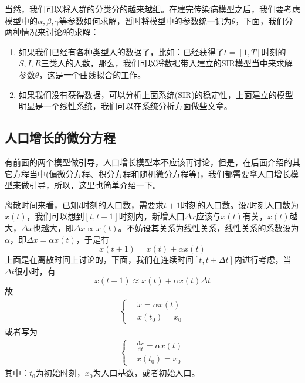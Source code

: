 		\par
		当然，我们可以将人群的分类分的越来越细。在建完传染病模型之后，我们要考虑模型中的$\alpha ,\beta, \gamma$等参数如何求解，暂时将模型中的参数统一记为$\theta $，下面，我们分两种情况来讨论$\theta $的求解：
		\begin{enumerate}
		\item 如果我们已经有各种类型人的数据了，比如：已经获得了$t = [1,T]$时刻的$S,I,R$三类人的人数，那么，我们可以将数据带入建立的SIR模型当中来求解参数$\theta $，这是一个曲线拟合的工作。
		\item 如果我们没有获得数据，可以分析上面系统(SIR)的稳定性，上面建立的模型明显是一个线性系统，我们可以在系统分析方面做些文章。
		\end{enumerate}

	\subsection{人口增长的微分方程}
		\par
		有前面的两个模型做引导，人口增长模型本不应该再讨论，但是，在后面介绍的其它方程当中(偏微分方程、积分方程和随机微分方程等)，我们都需要拿人口增长模型来做引导，所以，这里也简单介绍一下。
		\par
		离散时间来看，已知$t$时刻的人口数，需要求$t+1$时刻的人口数。设$t$时刻人口数为$x(t)$，我们可以想到$[t,t+1]$时刻内，新增人口$\Delta x$应该与$x(t)$有关，$x(t)$越大，$\Delta x$也越大，即$\Delta x \propto x(t)$。不妨设其关系为线性关系，线性关系的系数设为$\alpha$，即$\Delta x = \alpha x(t)$，于是有
		\[
			x(t+1)=x(t)+\alpha x(t)
		\]
		上面是在离散时间上讨论的，下面，我们在连续时间$[t,t+\Delta t]$内进行考虑，当$\Delta t$很小时，有
		\[
			x(t+1)\approx x(t)+\alpha x(t)\Delta t
		\]
		故
		\begin{align*}
			 \left\{
				 \begin{aligned}
					 &\dot{x} = \alpha x(t)\\
					 &x(t_0) = x_0
				 \end{aligned}
			 \right.
		\end{align*}
		或者写为
		\begin{align*}
			 \left\{
				 \begin{aligned}
					 &\frac{\mathrm{d}x}{\mathrm{d}t} = \alpha x(t)\\
					 &x(t_0) = x_0
				 \end{aligned}
			 \right.
		\end{align*}
		其中：$t_0$为初始时刻，$x_0$为人口基数，或者初始人口。

